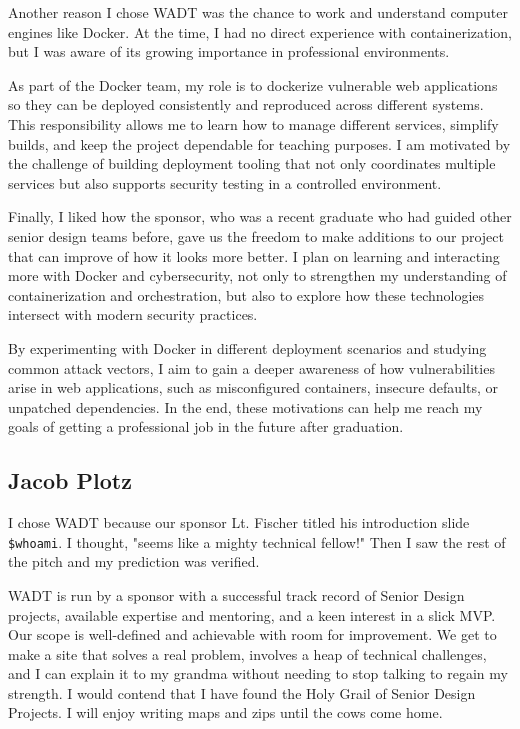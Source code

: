 \documentclass[12pt,titlepage]{article}
\begin{document}
Another reason I chose WADT was the chance to work and understand computer engines like Docker. At the time, I had no direct experience with containerization, but I was aware of its growing importance in professional environments.

As part of the Docker team, my role is to dockerize vulnerable web applications so they can be deployed consistently and reproduced across different systems. This responsibility allows me to learn how to manage different services, simplify builds, and keep the project dependable for teaching purposes. I am motivated by the challenge of building deployment tooling that not only coordinates multiple services but also supports security testing in a controlled environment. 

Finally, I liked how the sponsor, who was a recent graduate who had guided other senior design teams before, gave us the freedom to make additions to our project that can improve of how it looks more better. I plan on learning and interacting more with Docker and cybersecurity, not only to strengthen my understanding of containerization and orchestration, but also to explore how these technologies intersect with modern security practices.

By experimenting with Docker in different deployment scenarios and studying common attack vectors, I aim to gain a deeper awareness of how vulnerabilities arise in web applications, such as misconfigured containers, insecure defaults, or unpatched dependencies. In the end, these motivations can help me reach my goals of getting a professional job in the future after graduation. 

\subsection{Jacob Plotz}
I chose WADT because our sponsor Lt. Fischer titled his introduction slide \texttt{\$whoami}. I thought, "seems like a mighty technical fellow!" Then I saw the rest of the pitch and my prediction was verified.

WADT is run by a sponsor with a successful track record of Senior Design projects, available expertise and mentoring, and a keen interest in a slick MVP. Our scope is well-defined and achievable with room for improvement. We get to make a site that solves a real problem, involves a heap of technical challenges, and I can explain it to my grandma without needing to stop talking to regain my strength. I would contend that I have found the Holy Grail of Senior Design Projects. I will enjoy writing maps and zips until the cows come home.
\end{document}
